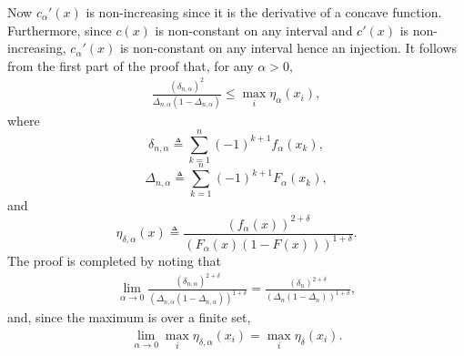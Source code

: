 Now $c_\alpha'(x)$ is non-increasing since it is the derivative of a concave function. Furthermore, since $c(x)$ is non-constant on any interval and $c'(x)$ is non-increasing, $c_\alpha'(x)$ is non-constant on any interval hence an injection. It follows from the first part of the proof that, for any $\alpha>0$,
\begin{align}
\label{eq:proof:lem:bound_intervals}
\frac{(\delta_{n,\alpha})^2}{\Delta_{n,\alpha}(1-\Delta_{n,\alpha})} \leq \max_i \eta_{\alpha}(x_i),
\end{align}
where 
\[
\delta_{n,\alpha} \triangleq  \sum_{k=1}^{n} (-1)^{k+1} f_{\alpha}(x_k),
\]
\[
\Delta_{n,\alpha} \triangleq \sum_{k=1}^n (-1)^{k+1} F_{\alpha}(x_k), 
\]
and 
\[
\eta_{\delta,\alpha}(x) \triangleq \frac{(f_\alpha(x))^{2+\delta}}{\left(F_{\alpha}(x)(1-F(x)) \right)^{1+\delta}}. 
\]
The proof is completed by noting that 
\begin{align*}
\lim_{\alpha \to 0} \frac{(\delta_{n,\alpha})^{2+\delta} }{ \left(\Delta_{n,\alpha}(1-\Delta_{n,\alpha})\right)^{1+\delta}}  = \frac{(\delta_{n})^{2+\delta }}{\left(\Delta_{n}(1-\Delta_{n}) \right)^{1+\delta}},  
\end{align*}
and, since the maximum is over a finite set,
\begin{align*}
\lim_{\alpha \to 0}  \max_i \eta_{\delta,\alpha}(x_i)  = \max_i\eta_\delta(x_i).
\end{align*}




\QEDA 

